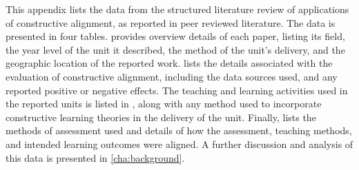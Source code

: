 \newcommand{\poc}{\begin{sideways}\textbf{Outcomes~ }\end{sideways}}			%
\newcommand{\pst}{\begin{sideways}\textbf{Satisfaction~ }\end{sideways}}			%
\newcommand{\peg}{\begin{sideways}\textbf{Engagement~ }\end{sideways}}			%
\newcommand{\pot}{\begin{sideways}\textbf{Other}\end{sideways}}			%
\newcommand{\nst}{\begin{sideways}\textbf{Staff Workload~ }\end{sideways}}			%
\newcommand{\nsd}{\begin{sideways}\textbf{Student Workload~ }\end{sideways}}			%
\newcommand{\nor}{\begin{sideways}\textbf{Other~ }\end{sideways}}			%
\newcommand{\noe}{\begin{sideways}\textbf{No Evaluation~ }\end{sideways}}			%

\newcommand{\intlec}{\begin{sideways}\textbf{Interactive Classes~ }\end{sideways}}			%

\renewcommand{\arraystretch}{1.3}

This appendix lists the data from the structured literature review of applications of constructive alignment, as reported in peer reviewed literature. The data is presented in four tables.  provides overview details of each paper, listing its field, the year level of the unit it described, the method of the unit's delivery, and the geographic location of the reported work.  lists the details associated with the evaluation of constructive alignment, including the data sources used, and any reported positive or negative effects. The teaching and learning activities used in the reported units is listed in , along with any method used to incorporate constructive learning theories in the delivery of the unit. Finally,  lists the methods of assessment used and details of how the assessment, teaching methods, and intended learning outcomes were aligned. A further discussion and analysis of this data is presented in \cref{cha:background}.

